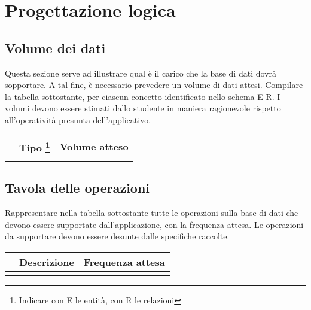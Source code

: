 \section{Progettazione logica}

\subsection*{Volume dei dati}

\begin{templateblock}
    Questa sezione serve ad illustrare qual è il carico che la base di dati
    dovrà sopportare.
    A tal fine, è necessario prevedere un volume di dati attesi.
    Compilare la tabella sottostante, per ciascun concetto identificato nello
    schema E-R. I volumi devono essere stimati dallo studente in maniera
    ragionevole rispetto all’operatività presunta dell’applicativo.
\end{templateblock}

\begin{tabularx}{\linewidth}{|X|l|X|}
    \hline
    \rowcolor{tblhdrcolor}
    \multicolumn{1}{|c|}{\textbf{Concetto nello schema}}
     & \multicolumn{1}{|c|}{\textbf{Tipo}
        \footnote{Indicare con E le entità, con R le relazioni}}
     & \multicolumn{1}{|c|}{\textbf{Volume atteso}}
    \\\hline
    \hfill
     & \hfill
     & \hfill
    \\ \hline
\end{tabularx}

\subsection*{Tavola delle operazioni}

\begin{templateblock}
    Rappresentare nella tabella sottostante tutte le operazioni sulla base
    di dati che devono essere supportate dall’applicazione, con la
    frequenza attesa.
    Le operazioni da supportare devono essere desunte dalle specifiche raccolte.
\end{templateblock}

\begin{tabularx}{\linewidth}{|l|X|X|}
    \hline
    \rowcolor{tblhdrcolor}
    \multicolumn{1}{|c|}{\textbf{Cod.}}
     & \multicolumn{1}{|c|}{\textbf{Descrizione}}
     & \multicolumn{1}{|c|}{\textbf{Frequenza attesa}}
    \\\hline
    \hfill
     & \hfill
     & \hfill
    \\ \hline
\end{tabularx}


